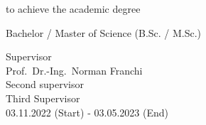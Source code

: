 \begin{titlepage}
\begin{center}
				\normalsize{to achieve the academic degree}
				
				\large{Bachelor / Master of Science (B.Sc. / M.Sc.)}
				
				\vspace{12mm}	
			
			\vfill
			\large
			Supervisor\\
			{Prof.~Dr.-Ing.~Norman Franchi} \\
			{Second supervisor} \\
			{Third Supervisor} \\
			\vspace{3mm}
			{03.11.2022 (Start)} - {03.05.2023} (End) \\			
			
			\end{center}
	\end{titlepage}%